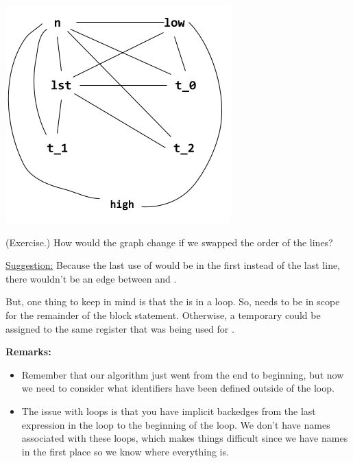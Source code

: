 \begin{center}
    \includegraphics[scale=0.6]{assets/loc_pt2.png}
\end{center}

\begin{mdframed}
    (Exercise.) How would the graph change if we swapped the order of the  lines?

    \begin{mdframed}
        \underline{Suggestion:} Because the last use of  would be in the first  instead of the last line, there wouldn't be an edge between  and . 

        \bigskip 

        But, one thing to keep in mind is that the  is in a loop. So,  needs to be in scope for the remainder of the block statement. Otherwise, a temporary could be assigned to the same register that was being used for . 
    \end{mdframed}
\end{mdframed}
\textbf{Remarks:}
\begin{itemize}
    \item Remember that our algorithm just went from the end to beginning, but now we need to consider what identifiers have been defined outside of the loop. 

    \item The issue with loops is that you have implicit backedges from the last expression in the loop to the beginning of the loop. We don't have names associated with these loops, which makes things difficult since we have names in the first place so we know where everything is. 
\end{itemize}

